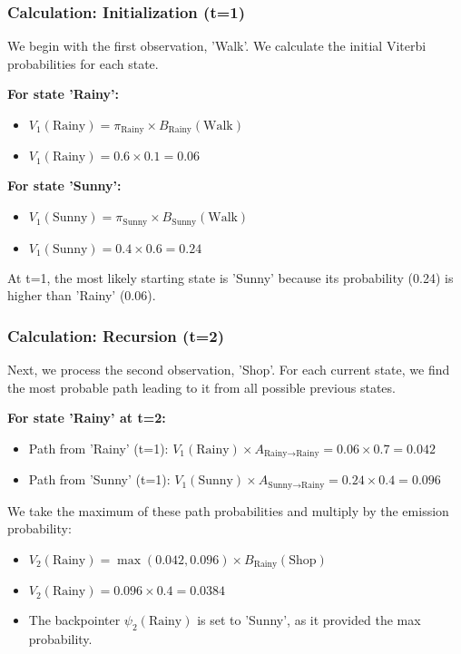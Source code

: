 \documentclass[aspectratio=43, 9pt]{beamer}
\begin{document}
\begin{frame}
    \frametitle{Calculation: Initialization (t=1)}
    We begin with the first observation, 'Walk'. We calculate the initial Viterbi probabilities for each state.
    
    \vspace{1em}
    
    \textbf{For state 'Rainy':}
    \begin{itemize}
        \item $V_1(\text{Rainy}) = \pi_{\text{Rainy}} \times B_{\text{Rainy}}(\text{Walk})$
        \item $V_1(\text{Rainy}) = 0.6 \times 0.1 = 0.06$
    \end{itemize}
    
    \textbf{For state 'Sunny':}
    \begin{itemize}
        \item $V_1(\text{Sunny}) = \pi_{\text{Sunny}} \times B_{\text{Sunny}}(\text{Walk})$
        \item $V_1(\text{Sunny}) = 0.4 \times 0.6 = 0.24$
    \end{itemize}
    
    \begin{Takeaway}
        At t=1, the most likely starting state is 'Sunny' because its probability (0.24) is higher than 'Rainy' (0.06).
    \end{Takeaway}
\end{frame}

\begin{frame}
    \frametitle{Calculation: Recursion (t=2)}
    Next, we process the second observation, 'Shop'. For each current state, we find the most probable path leading to it from all possible previous states.
    
    \vspace{1em}
    
    \textbf{For state 'Rainy' at t=2:}
    \begin{itemize}
        \item Path from 'Rainy' (t=1): $V_1(\text{Rainy}) \times A_{\text{Rainy} \to \text{Rainy}} = 0.06 \times 0.7 = 0.042$
        \item Path from 'Sunny' (t=1): $V_1(\text{Sunny}) \times A_{\text{Sunny} \to \text{Rainy}} = 0.24 \times 0.4 = 0.096$
    \end{itemize}
    
    \begin{NewTheorem}
        We take the maximum of these path probabilities and multiply by the emission probability:
        \begin{itemize}
            \item $V_2(\text{Rainy}) = \max(0.042, 0.096) \times B_{\text{Rainy}}(\text{Shop})$
            \item $V_2(\text{Rainy}) = 0.096 \times 0.4 = 0.0384$
            \item The backpointer $\psi_2(\text{Rainy})$ is set to 'Sunny', as it provided the max probability.
        \end{itemize}
    \end{NewTheorem}
\end{frame}
\end{document}
